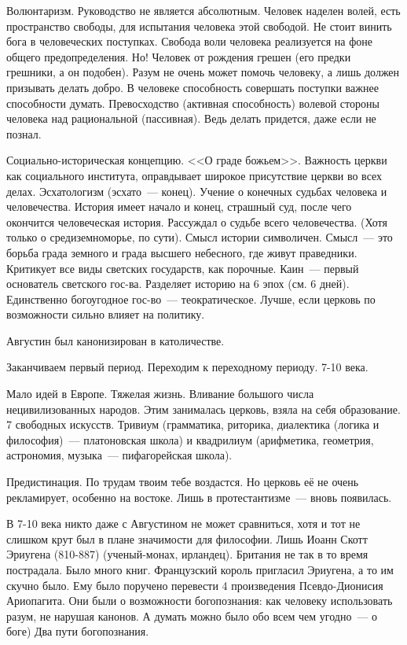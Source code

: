 Волюнтаризм. Руководство не является абсолютным. Человек наделен волей, есть пространство свободы, для испытания человека этой свободой. Не стоит винить бога в человеческих поступках. Свобода воли человека реализуется на фоне общего предопределения. Но! Человек от рождения грешен (его предки грешники, а он подобен). Разум не очень может помочь человеку, а лишь должен призывать делать добро. В человеке способность совершать поступки важнее способности думать. Превосходство (активная способность) волевой стороны человека над рациональной (пассивная). Ведь делать придется, даже если не познал.

Социально-историческая концепцию. <<О граде божьем>>. Важность церкви как социального института, оправдывает широкое присутствие церкви во всех делах. Эсхатологизм (эсхато~--- конец). Учение о конечных судьбах человека и человечества. История имеет начало и конец, страшный суд, после чего окончится человеческая история. Рассуждал о судьбе всего человечества. (Хотя только о средиземноморье, по сути). Смысл истории символичен. Смысл~--- это борьба града земного и града высшего небесного, где живут праведники. Критикует все виды светских государств, как порочные. Каин~--- первый основатель светского гос-ва. Разделяет историю на 6 эпох (см. 6 дней). Единственно богоугодное гос-во~--- теократическое. Лучше, если церковь по возможности сильно влияет на политику.

Августин был канонизирован в католичестве.

Заканчиваем первый период. Переходим к переходному периоду. 7-10 века.

Мало идей в Европе. Тяжелая жизнь. Вливание большого числа нецивилизованных народов. Этим занималась церковь, взяла на себя образование. 7 свободных искусств. Тривиум (грамматика, риторика, диалектика (логика и философия)~--- платоновская школа) и квадрилиум (арифметика, геометрия, астрономия, музыка~--- пифагорейская школа).

Предистинация. По трудам твоим тебе воздастся. Но церковь её не очень рекламирует, особенно на востоке. Лишь в протестантизме~--- вновь появилась.

В 7-10 века никто даже с Августином не может сравниться, хотя и тот не слишком крут был в плане значимости для философии.
Лишь Иоанн Скотт Эриугена (810-887) (ученый-монах, ирландец). Британия не так в то время пострадала. Было много книг. Французский король пригласил Эриугена, а то им скучно было. Ему было поручено перевести 4 произведения Псевдо-Дионисия Ариопагита. Они были о возможности богопознания: как человеку использовать разум, не нарушая канонов. А думать можно было обо всем чем угодно~--- о боге)
Два пути богопознания.

